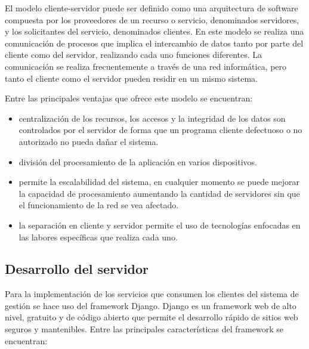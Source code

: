 El modelo cliente-servidor puede ser definido como una arquitectura
de software compuesta por los proveedores de un recurso o servicio, 
denominados servidores, y los solicitantes del servicio, denominados
clientes. En este modelo se realiza una comunicación de procesos
que implica el intercambio de datos tanto por parte del cliente 
como del servidor, realizando cada uno funciones diferentes. La comunicación
se realiza frecuentemente a través de una red informática, pero 
tanto el cliente como el servidor pueden residir en un mismo sistema.

Entre las principales ventajas que ofrece este modelo se encuentran:

\begin{itemize}
    \item centralización de los recursos, los accesos y la integridad de los datos son controlados por el servidor de forma que un programa cliente defectuoso o no autorizado no pueda dañar el sistema.
    \item división del procesamiento de la aplicación en varios dispositivos.
    \item permite la escalabilidad del sistema, en cualquier momento se puede mejorar la capacidad de procesamiento aumentando la cantidad de servidores sin que el funcionamiento de la red se vea afectado.
    \item la separación en cliente y servidor permite el uso de tecnologías enfocadas en las labores específicas que realiza cada uno. 
\end{itemize}
 


\subsection{Desarrollo del servidor}
Para la implementación de los servicios que consumen los clientes del 
sistema de gestión se hace uso del framework Django. Django es un framework
web de alto nivel, gratuito y de código abierto que permite el desarrollo rápido de 
sitios web seguros y mantenibles. Entre las principales características
del framework se encuentran:

